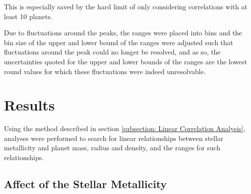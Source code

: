 \documentclass[a4paper,twocolumn,12pt]{article}
\begin{document}
This is especially saved by the hard limit of only considering correlations with at least 10 planets.

Due to fluctuations around the peaks, the ranges were placed into bins and the bin size of the upper and lower bound of the ranges were adjusted such that fluctuations around the peak could no longer be resolved, and as so, the uncertainties quoted for the upper and lower bounds of the ranges are the lowest round values for which these fluctuations were indeed unresolvable.




\section{Results}


Using the method described in section \ref{subsection: Linear Correlation Analysis}, analyses were performed to search for linear relationships between stellar metallicity and planet mass, radius and density, and the ranges for such relationships.


\subsection{Affect of the Stellar Metallicity}
\end{document}
